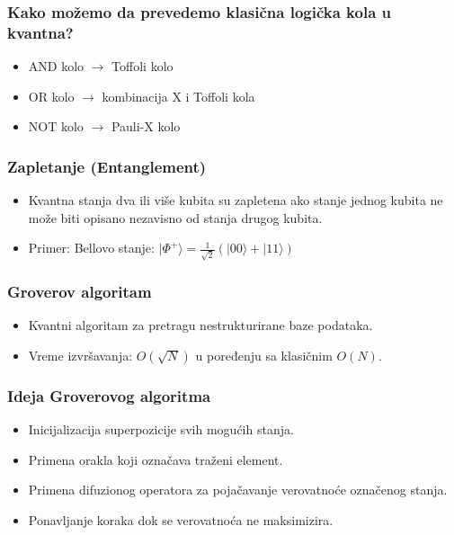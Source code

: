 \documentclass[aspectratio=169]{beamer}
\begin{document}
\begin{frame}
    \frametitle{Kako možemo  da prevedemo klasična logička kola u kvantna?}

    \begin{itemize}
        \item AND kolo $\rightarrow$ Toffoli kolo
        \item OR kolo $\rightarrow$ kombinacija X i Toffoli kola
        \item NOT kolo $\rightarrow$ Pauli-X kolo 
    \end{itemize}    
\end{frame}


\begin{frame}
    \frametitle{Zapletanje (Entanglement)}

    \begin{itemize}
        \item Kvantna stanja dva ili više kubita su zapletena ako stanje jednog kubita ne može biti opisano nezavisno od stanja drugog kubita.
        \item Primer: Bellovo stanje: $ |\Phi^+\rangle = \frac{1}{\sqrt{2}} (|00\rangle + |11\rangle) $
    \end{itemize}
\end{frame}

\begin{frame}
    \frametitle{Groverov algoritam}
    \begin{itemize}
        \item Kvantni algoritam za pretragu nestrukturirane baze podataka.
        \item Vreme izvršavanja: $O(\sqrt{N})$ u poređenju sa klasičnim $O(N)$.
    \end{itemize}
\end{frame}

\begin{frame}
    \frametitle{Ideja Groverovog algoritma}
    \begin{itemize}
        \item Inicijalizacija superpozicije svih mogućih stanja.
        \item Primena orakla koji označava traženi element.
        \item Primena difuzionog operatora za pojačavanje verovatnoće označenog stanja.
        \item Ponavljanje koraka dok se verovatnoća ne maksimizira.
    \end{itemize}    
\end{frame}
\end{document}
